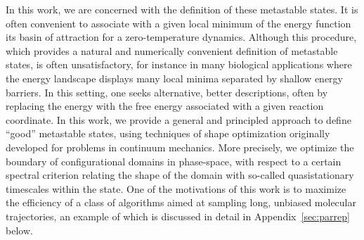 \documentclass[a4]{article}
\newcommand{\1}{\mathbbm 1}
\begin{document}
    In this work, we are concerned with the definition of these metastable states.
    It is often convenient to associate with a given local minimum of the energy function its basin of attraction for a zero-temperature dynamics. Although this procedure, which provides a natural and numerically convenient definition of metastable states, is often unsatisfactory, for instance in many biological applications where the energy landscape displays many local minima separated by shallow energy barriers.
    In this setting, one seeks alternative, better descriptions, often by replacing the energy with the free energy associated with a given reaction coordinate. In this work, we provide a general and principled approach to define ``good'' metastable states, using techniques of shape optimization originally developed for problems in continuum mechanics.
    More precisely, we optimize the boundary of configurational domains in phase-space, with respect to a certain spectral criterion relating the shape of the domain with so-called quasistationary timescales within the state.
    One of the motivations of this work is to maximize the efficiency of a class of algorithms aimed at sampling long, unbiased molecular trajectories, an example of which is discussed in detail in Appendix~\ref{sec:parrep} below.
\end{document}
